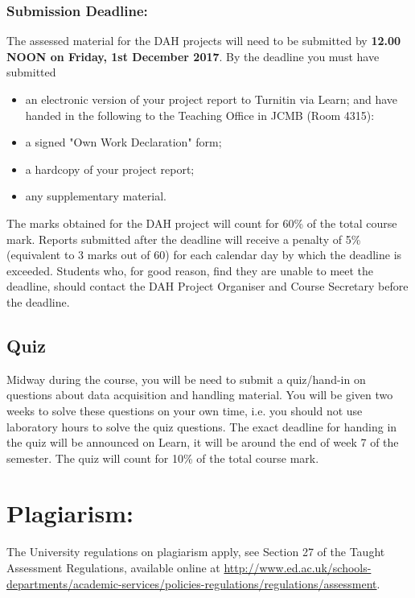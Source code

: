 \subsubsection{Submission Deadline:}
The assessed material for the DAH projects will need to be submitted by {\bf 12.00 NOON on Friday, 1st December 2017}. By the deadline you must have submitted 
\begin{itemize}
\item an electronic version of your project report to Turnitin via Learn;
and have handed in the following to the Teaching Office in JCMB (Room 4315):
\item a signed "Own Work Declaration" form;
\item a hardcopy of your project report;
\item any supplementary material. 
\end{itemize}
The marks obtained for the DAH project will count for 60\% of the total course mark. 
Reports submitted after the deadline will receive a penalty of 5\% (equivalent to 3 marks out of 60) for each calendar day by which the deadline is exceeded. Students who, for good reason, find they are unable to meet the deadline, should contact the DAH Project Organiser and Course Secretary before
the deadline.

\subsection{Quiz}
Midway during the course, you will be need to submit a quiz/hand-in on  questions about data acquisition and handling material. You will be given two weeks to solve these questions on your own time, i.e. you should not use laboratory hours to solve the quiz questions. The exact deadline for handing in the quiz will be announced on Learn, it will be around the end of week 7 of the semester. 
The quiz will count for 10\% of the total course mark. 

\section{Plagiarism:}
The University regulations on plagiarism apply, see Section 27 of the Taught Assessment Regulations, available online at \url{http://www.ed.ac.uk/schools-departments/academic-services/policies-regulations/regulations/assessment}.


